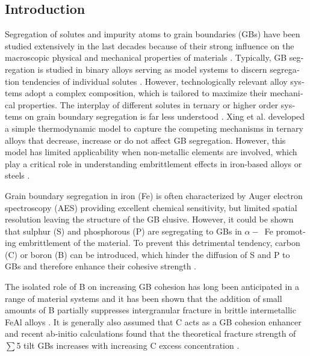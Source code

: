 \documentclass[12pt,a4paper,twoside,twocolumn,english,english]{article}
\begin{document}
\begin{otherlanguage}{english}
\section*{Introduction}
Segregation of solutes and impurity atoms to grain boundaries (GBs) have been studied extensively in the last decades because of their strong influence on the macroscopic physical and mechanical properties of materials \cite{papazian_grain_1971-1, suzuki_effect_1983, hansel_grain_1986, lejcek_temperature_1990, lejcek_segregation_1991, lejcek_characterization_1994, fraczkiewicz_boron_1998, fraczkiewicz_influence_2000, krakauer_atomic_1993, maruyama_interaction_2003}. Typically, GB segregation is studied in binary alloys serving as model systems to discern segregation tendencies of individual solutes \cite{papazian_grain_1971-1, lejcek_temperature_1990, krakauer_atomic_1993, maruyama_interaction_2003}. However, technologically relevant alloy systems adopt a complex composition, which is tailored to maximize their mechanical properties. The interplay of different solutes in ternary or higher order systems on grain boundary segregation is far less understood \cite{seah_grain_1980, xing_solute_2018}. Xing et al. \cite{xing_solute_2018} developed a simple thermodynamic model to capture the competing mechanisms in ternary alloys that decrease, increase or do not affect GB segregation. However, this model has limited applicability when non-metallic elements are involved, which play a critical role in understanding embrittlement effects in iron-based alloys or steels \cite{hansel_grain_1986, guttmann_equilibrium_1975}.        

Grain boundary segregation in iron (Fe) is often characterized by Auger electron spectroscopy (AES) providing excellent chemical sensitivity, but limited spatial resolution leaving the structure of the GB elusive. However, it could be shown that sulphur (S) and phosphorous (P) are segregating to GBs \cite{grabke_surface_1986, grabke_equilibrium_1977} in $\alpha-$~Fe promoting embrittlement of the material. To prevent this detrimental tendency, carbon (C) or boron (B) can be introduced, which hinder the diffusion of S and P to GBs and therefore enhance their cohesive strength \cite{tauber_grain_1978, pichard_influence_1976, liu_effect_1992}.

The isolated role of B on increasing GB cohesion has long been anticipated in a range of material systems \cite{liu_effect_1985, liu_effect_1992, painter_effects_1987, wu_first_1994} and it has been shown that the addition of small amounts of B partially suppresses intergranular fracture in brittle intermetallic FeAl alloys \cite{lejcek_boron_2003, fraczkiewicz_boron_1998, fraczkiewicz_influence_2000}. It is generally also assumed that C acts as a GB cohesion enhancer and recent ab-initio calculations found that the theoretical fracture strength of $\sum$5 tilt GBs increases with increasing C excess concentration \cite{wang_first-principles_2016}. 


\end{otherlanguage}
\end{document}
